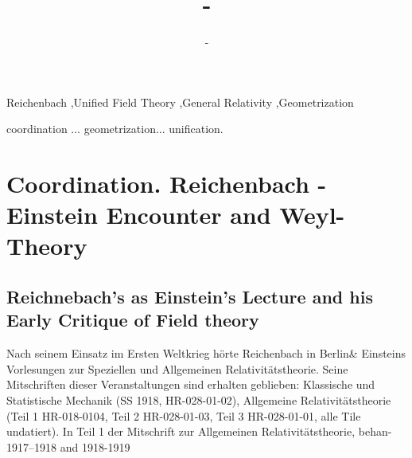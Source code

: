 \documentclass[draft]{article}
\title{-}
\author{-}
\begin{document}
\maketitle

\begin{abstract}
\lipsum*[1-2]
\end{abstract}

\begin{keywords}
Reichenbach \sep Unified Field Theory \sep General Relativity \sep Geometrization	
\end{keywords}


coordination ... geometrization... unification.



\section{Coordination. Reichenbach - Einstein Encounter and Weyl-Theory}

\subsection{Reichnebach's as Einstein's Lecture and his Early Critique of Field theory}

Nach seinem Einsatz im Ersten Weltkrieg hörte Reichenbach in Berlin& Einsteins Vorlesungen zur Speziellen und Allgemeinen Relativitätstheorie. Seine Mitschriften dieser Veranstaltungen sind erhalten geblieben: Klassische und Statistische Mechanik (SS 1918, HR-028-01-02), Allgemeine Relativitätstheorie (Teil 1 HR-018-0104, Teil 2 HR-028-01-03, Teil 3 HR-028-01-01, alle Tile undatiert). In Teil 1 der Mitschrift zur Allgemeinen Relativitätstheorie, behan- 1917--1918 and 1918-1919
\end{document}
